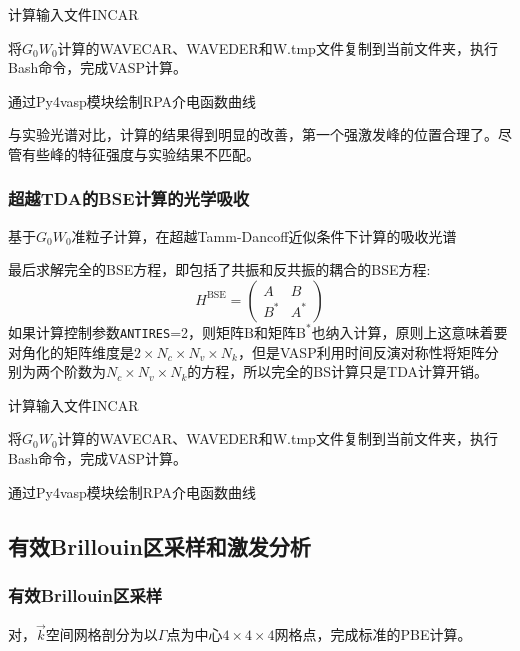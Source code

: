 计算输入文件\textrm{INCAR}

将$G_0W_0$计算的\textrm{WAVECAR}、\textrm{WAVEDER}和\textrm{W.tmp}文件复制到当前文件夹，执行\textrm{Bash}命令，完成\textrm{VASP}计算。

通过\textrm{Py4vasp}模块绘制\textrm{RPA}介电函数曲线

与实验光谱对比，计算的结果得到明显的改善，第一个强激发峰的位置合理了。尽管有些峰的特征强度与实验结果不匹配。%

\subsubsection{超越\rm{TDA}的\rm{BSE}计算的光学吸收}
基于$G_0W_0$准粒子计算，在超越\textrm{Tamm-Dancoff}近似条件下计算的吸收光谱

最后求解完全的\textrm{BSE}方程，即包括了共振和反共振的耦合的\textrm{BSE}方程:
\begin{displaymath}
	H^{\mathrm{BSE}}=
	\begin{pmatrix}
		A &B\\
		B^{\ast} &A^{\ast}
	\end{pmatrix}
\end{displaymath}
如果计算控制参数\texttt{ANTIRES}=2，则矩阵$\mathrm{B}$和矩阵$\mathrm{B}^{\ast}$也纳入计算，原则上这意味着要对角化的矩阵维度是$2\times N_c\times N_v\times N_k$，但是\textrm{VASP}利用时间反演对称性将矩阵分别为两个阶数为$N_c\times N_v\times N_k$的方程，所以完全的\textrm{BS}计算只是\textrm{TDA}计算开销。

计算输入文件\textrm{INCAR}

将$G_0W_0$计算的\textrm{WAVECAR}、\textrm{WAVEDER}和\textrm{W.tmp}文件复制到当前文件夹，执行\textrm{Bash}命令，完成\textrm{VASP}计算。

通过\textrm{Py4vasp}模块绘制\textrm{RPA}介电函数曲线

\subsection{有效\rm{Brillouin}区采样和激发分析}
\subsubsection{有效\rm{Brillouin}区采样}
对，$\vec k$空间网格剖分为以$\Gamma$点为中心$4\times4\times4$网格点，完成标准的\textrm{PBE}计算。
